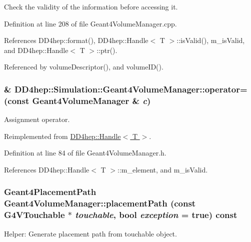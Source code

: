 Check the validity of the information before accessing it. 

Definition at line 208 of file Geant4VolumeManager.cpp.

References DD4hep::format(), DD4hep::Handle$<$ T $>$::isValid(), m\_\-isValid, and DD4hep::Handle$<$ T $>$::ptr().

Referenced by volumeDescriptor(), and volumeID().\hypertarget{class_d_d4hep_1_1_simulation_1_1_geant4_volume_manager_abe365aa64b701feeb8ee60d4ca4fbb95}{
\subsubsection[{operator=}]{\& DD4hep::Simulation::Geant4VolumeManager::operator= (const {\bf Geant4VolumeManager} \& {\em c})}}
\label{class_d_d4hep_1_1_simulation_1_1_geant4_volume_manager_abe365aa64b701feeb8ee60d4ca4fbb95}


Assignment operator. 

Reimplemented from \hyperlink{class_d_d4hep_1_1_handle_a9bbf8f498df42e81ad26fb00233505a6}{DD4hep::Handle$<$ T $>$}.

Definition at line 84 of file Geant4VolumeManager.h.

References DD4hep::Handle$<$ T $>$::m\_\-element, and m\_\-isValid.\hypertarget{class_d_d4hep_1_1_simulation_1_1_geant4_volume_manager_a5ac0311138047aaf8633ba7e59a266d8}{
\subsubsection[{placementPath}]{\setlength{\rightskip}{0pt plus 5cm}Geant4PlacementPath Geant4VolumeManager::placementPath (const G4VTouchable $\ast$ {\em touchable}, \/  bool {\em exception} = {\ttfamily true}) const}}
\label{class_d_d4hep_1_1_simulation_1_1_geant4_volume_manager_a5ac0311138047aaf8633ba7e59a266d8}


Helper: Generate placement path from touchable object. 

